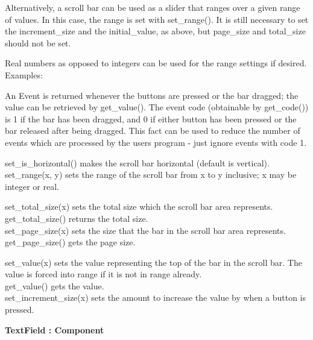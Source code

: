 Alternatively, a scroll bar can be used as a slider that ranges over a
given range of values. In this case, the range is set with
set\_range(). It is still necessary to set the increment\_size and the
initial\_value, as above, but page\_size and total\_size should not be
set.

Real numbers as opposed to integers can be used for the range settings
if desired. Examples:


An Event is returned whenever the buttons are pressed or the bar
dragged; the value can be retrieved by get\_value(). The event code
(obtainable by get\_code()) is 1 if the bar has been dragged, and 0 if
either button has been pressed or the bar released after being dragged.
This fact can be used to reduce the number of events which are
processed by the user{\textquotesingle}s program - just ignore events
with code 1.

set\_is\_horizontal() makes the scroll bar horizontal (default is
vertical).\\
set\_range(x, y) sets the range of the scroll bar from x to y inclusive;
x may be integer or real.

set\_total\_size(x) sets the total size which the scroll bar area
represents.\\
get\_total\_size() returns the total size.\\
set\_page\_size(x) sets the size that the bar in the scroll bar area
represents.\\
get\_page\_size() gets the page size.

set\_value(x) sets the value representing the top of the bar in the
scroll bar. The value is forced into range if it is not in range
already.\\
get\_value() gets the value.\\
set\_increment\_size(x) sets the amount to increase the value by when a
button is pressed.

{\sffamily\bfseries
{}TextField : Component}

